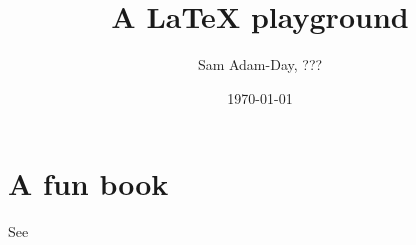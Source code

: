 \documentclass[a4paper]{article}
\title{A \texorpdfstring{\LaTeX}{LaTeX} playground}
\author{Sam Adam-Day, ???}
\date{\today}
\begin{document}
	\maketitle

    \section{A fun book}

	See \cite{Conway2001Osurreals}

	\printbibliography
\end{document}
